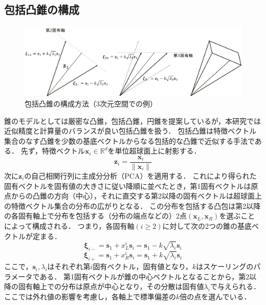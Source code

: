 \subsection{包括凸錐の構成}
\begin{figure}[htb]
	\centering
	\includegraphics[width=0.7\linewidth]{image/comprehensive_cone}
	\caption{包括凸錐の構成方法（3次元空間での例）}
	\label{fig:comprehensivecone}
\end{figure}

錐のモデルとして\cite{cone-sub}は厳密な凸錐，包括凸錐，円錐を提案しているが，本研究では近似精度と計算量のバランスが良い包括凸錐を扱う．
包括凸錐は特徴ベクトル集合のなす凸錐を少数の基底ベクトルからなる包括的な凸錐で近似する手法である．
先ず，特徴ベクトル$\bm x_i\in\mathbb{R}^d$を単位超球面上に射影する．
\begin{equation}
	\bm z_i=\frac{\bm x_i}{\|\bm x_i\|}
\end{equation}
次に$\bm z_i$の自己相関行列に主成分分析（PCA）を適用する．
これにより得られた固有ベクトルを固有値の大きさに従い降順に並べたとき，第1固有ベクトルは原点からの凸錐の方向（中心），それに直交する第2以降の固有ベクトルは超球面上の特徴ベクトル集合の分布の広がりとなる．
この分布を包括する凸包は第2以降の各固有軸上で分布を包括する（分布の端点などの）2点$(\bm x_L,\bm x_R)$を選ぶことによって構成される．
つまり，各固有軸$(i\geq 2)$に対して次の2つの錐の基底ベクトルが定まる．
\begin{equation}
	\bm \xi_{i-}=\bm s_1+x_L^i\bm s_i=\bm s_1-k\sqrt{\lambda_i}\bm s_i
\end{equation}
\begin{equation}
\bm \xi_{i+}=\bm s_1+x_R^i\bm s_i=\bm s_1+k\sqrt{\lambda_i}\bm s_i
\end{equation}
ここで，$\bm s_i, \lambda_i$はそれぞれ第$i$固有ベクトル，固有値となり，$k$はスケーリングのパラメータである．
第1固有ベクトルが錐の中心ベクトルとなることから，第2以降の固有軸上での分布は原点が中心となり，その分散は固有値$\lambda_i$で与えられる．
ここでは外れ値の影響を考慮し，各軸上で標準偏差の$k$倍の点を選んでいる．